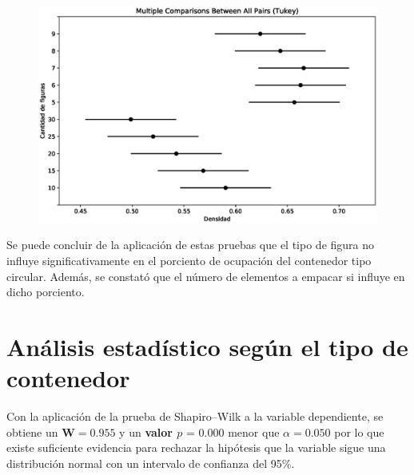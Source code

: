 \documentclass[5p,times]{elsarticle}
\begin{document}
	\begin{figure}
				\begin{center}
					\includegraphics[scale=0.42, trim=8 8 8 20, clip=true]{figuras/simultaneous_tukeyCantidad_figuras1.eps}
					\label{fig:tykey2}
				\end{center}
			\end{figure}
			
Se puede concluir de la aplicación de estas pruebas que el tipo de figura no influye significativamente en el porciento de ocupación del contenedor tipo circular. Además, se constató que el número de elementos a empacar si influye en dicho porciento.     
	
\section{Análisis estadístico según el tipo de contenedor}\label{Section6}
Con la aplicación de la prueba de Shapiro--Wilk a la variable dependiente, se obtiene un $\textbf{W}=0.955$ y un \textbf{valor $p$} = 0.000 menor que $\alpha = 0.050$ por lo que existe suficiente evidencia para rechazar la hipótesis que la variable sigue una distribución normal con un intervalo de confianza del 95\%.
\end{document}
